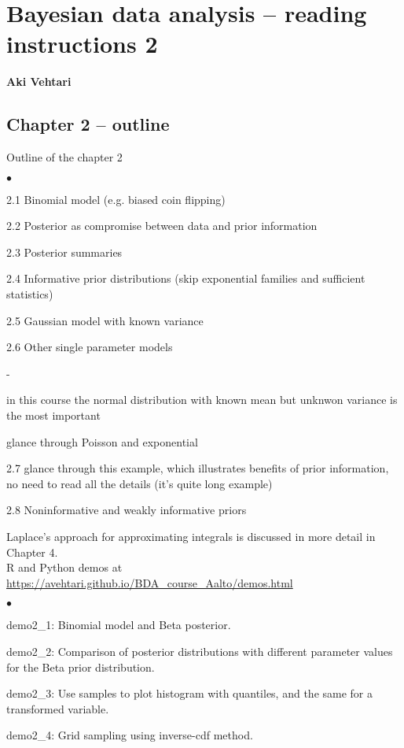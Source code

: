 \documentclass[a4paper,11pt,english]{article}
\begin{document}
\thispagestyle{empty}

\section*{Bayesian data analysis -- reading instructions 2} 
\smallskip
{\bf Aki Vehtari}
\smallskip

\subsection*{Chapter 2 -- outline}

Outline of the chapter 2
\begin{list}{$\bullet$}{\parsep=0pt\itemsep=2pt}
\item 2.1 Binomial model (e.g. biased coin flipping)
\item 2.2 Posterior as compromise between data and prior information
\item 2.3 Posterior summaries
\item 2.4 Informative prior distributions (skip exponential families and sufficient statistics)
\item 2.5 Gaussian model with known variance
\item 2.6 Other single parameter models
  \begin{list}{-}{\parsep=0pt\itemsep=2pt}
  \item in this course the normal distribution with known mean but
    unknwon variance is the most important
  \item glance through Poisson and exponential
  \end{list}
\item 2.7 glance through this example, which illustrates benefits of prior information, no need to read all the details (it's quite long example)
\item 2.8 Noninformative and weakly informative priors
\end{list}

Laplace's approach for approximating integrals is discussed in more
detail in Chapter 4.\\


R and Python demos at \url{https://avehtari.github.io/BDA_course_Aalto/demos.html}
\begin{list}{$\bullet$}{\parsep=0pt\itemsep=2pt}
\item demo2\_1: Binomial model and Beta posterior.
\item demo2\_2: Comparison of posterior distributions with different
parameter values for the Beta prior distribution.
\item demo2\_3: Use samples to plot histogram with quantiles, and
  the same for a transformed variable.
\item demo2\_4: Grid sampling using inverse-cdf method.
\end{list}
\end{document}
